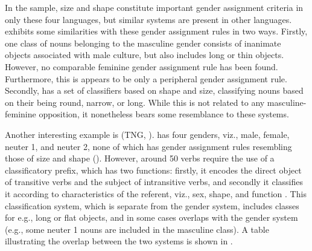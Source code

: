 \documentclass[output=collectionpaper]{langsci/langscibook}
\begin{document}
In the sample, size and shape constitute important gender assignment criteria in only these four languages, but similar systems are present in other languages.  exhibits some similarities with these gender assignment rules in two ways. Firstly, one class of nouns belonging to the masculine gender consists of inanimate objects associated with male culture, but also includes long or thin objects. However, no comparable feminine gender assignment rule has been found. Furthermore, this is appears to be only a peripheral gender assignment rule. Secondly,  has a set of classifiers based on shape and size, classifying nouns based on their being round, narrow, or long. While this is not related to any masculine-feminine opposition, it nonetheless bears some resemblance to these systems.


Another interesting example is  (TNG, ).  has four genders, viz., male, female, neuter 1, and neuter 2, none of which has gender assignment rules resembling those of size and shape (\citealt[171--176]{Fedden2011}). However, around 50 verbs require the use of a classificatory prefix, which has two functions: firstly, it encodes the direct object of transitive verbs and the subject of intransitive verbs, and secondly it classifies it according to characteristics of the referent, viz., sex, shape, and function \citep[185]{Fedden2011}. This classification system, which is separate from the gender system, includes classes for e.g., long or flat objects, and in some cases overlaps with the gender system (e.g., some neuter 1 nouns are included in the masculine class). A table illustrating the overlap between the two systems is shown in .

%
%
\end{document}
